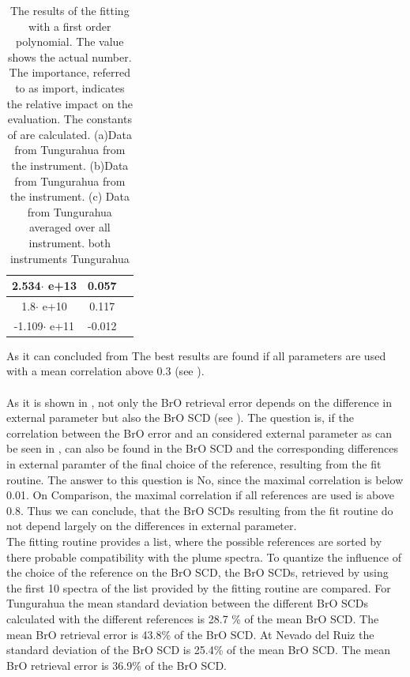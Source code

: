\documentclass  [
  paper    = a4,
  BCOR     = 10mm,
  twoside,
  fontsize = 12pt,
  fleqn,
  toc      = bibnumbered,
  toc      = listofnumbered,
  numbers  = noendperiod,
  headings = normal,
  listof   = leveldown,
  version  = 3.03
]                                       {scrreprt}
\begin{document}
\begin{table}[h!]
{\begin{tabular}{c|c|c}
			2.534$\cdot$ e+13&0.057\\
			\midrule
			1.8$\cdot$ e+10& 0.117\\
			\midrule
			-1.109$\cdot$ e+11&-0.012\\
			\midrule
			\bottomrule
	\end{tabular}}
		\label{tab:coefTung}
		\caption{The results of the fitting with a first order polynomial. The value shows the actual number. The importance,  referred to as
			import,  indicates the relative impact on the evaluation.
			The constants of  are calculated.
			(a)Data from Tungurahua  from the instrument. 
			(b)Data from Tungurahua from the  instrument. %
			(c) Data from Tungurahua averaged over all instrument.  %
			 both instruments Tungurahua%
		 }
	\end{table}			
	As it can concluded from  The best results are found if all parameters are used with a mean correlation above 0.3 (see ).\\
	\\
	As it is shown in , not only the BrO retrieval error depends on the difference in external parameter but also the BrO SCD (see ). 
	The question is, if the correlation between the BrO error and an considered external parameter as can be seen in , can also be found in the BrO SCD and the corresponding differences in external paramter of the final choice of the reference, resulting from the fit routine. The answer to this question is No, since the maximal correlation is below 0.01. On Comparison, the maximal correlation if all references are used is above 0.8. Thus we can conclude, that the BrO SCDs resulting from the fit routine do not depend largely on the differences in external parameter.\\
	
	The fitting routine provides a list, where the possible references are sorted by there probable compatibility with the plume spectra. To quantize the influence of the choice of the reference on the BrO SCD, the BrO SCDs, retrieved by using the first 10 spectra of the list provided by the fitting routine are compared.
	For Tungurahua the mean standard deviation between the different BrO SCDs calculated with the different references is 28.7 \% of the mean BrO SCD. The mean BrO retrieval error is 43.8\% of the BrO SCD.
	At Nevado del Ruiz the standard deviation of the BrO SCD is 25.4\% of the mean BrO SCD. The mean BrO retrieval error is 36.9\% of the BrO SCD.
	
\end{document}
